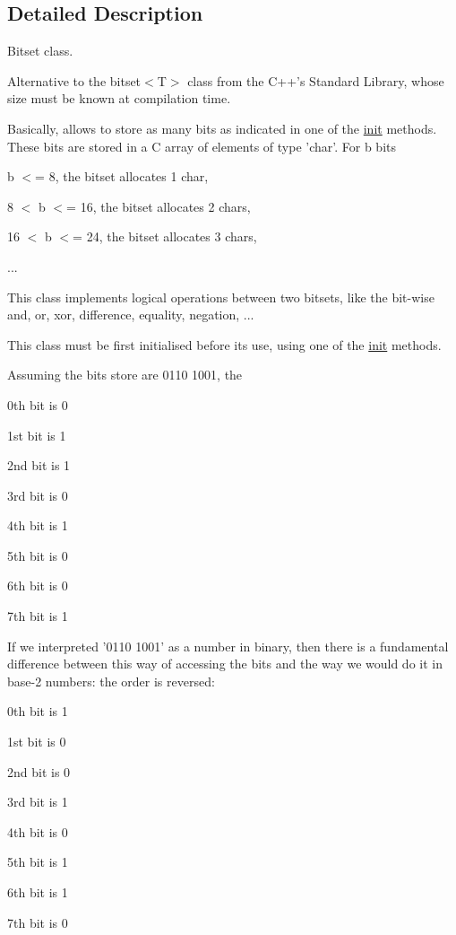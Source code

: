 \subsection{Detailed Description}
Bitset class. 

Alternative to the bitset$<$\-T$>$ class from the C++'s Standard Library, whose size must be known at compilation time.

Basically, allows to store as many bits as indicated in one of the \hyperlink{classlgraph_1_1utils_1_1static__bitset_afad1ede9e08c9d59b641150d2203edca}{init} methods. These bits are stored in a C array of elements of type 'char'. For b bits
\begin{DoxyItemize}
\item b $<$= 8, the bitset allocates 1 char,
\item 8 $<$ b $<$= 16, the bitset allocates 2 chars,
\item 16 $<$ b $<$= 24, the bitset allocates 3 chars,
\item ...
\end{DoxyItemize}

This class implements logical operations between two bitsets, like the bit-\/wise and, or, xor, difference, equality, negation, ...

This class must be first initialised before its use, using one of the \hyperlink{classlgraph_1_1utils_1_1static__bitset_afad1ede9e08c9d59b641150d2203edca}{init} methods.

Assuming the bits store are 0110 1001, the
\begin{DoxyItemize}
\item 0th bit is 0
\item 1st bit is 1
\item 2nd bit is 1
\item 3rd bit is 0
\item 4th bit is 1
\item 5th bit is 0
\item 6th bit is 0
\item 7th bit is 1
\end{DoxyItemize}

If we interpreted '0110 1001' as a number in binary, then there is a fundamental difference between this way of accessing the bits and the way we would do it in base-\/2 numbers\-: the order is reversed\-:
\begin{DoxyItemize}
\item 0th bit is 1
\item 1st bit is 0
\item 2nd bit is 0
\item 3rd bit is 1
\item 4th bit is 0
\item 5th bit is 1
\item 6th bit is 1
\item 7th bit is 0
\end{DoxyItemize}

